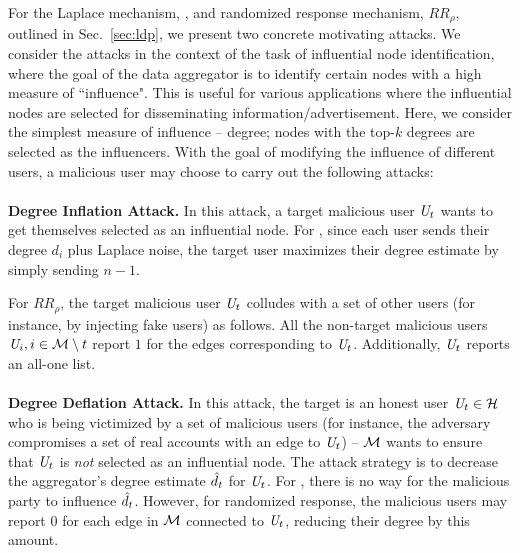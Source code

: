 For the Laplace mechanism, \RLap, and randomized response mechanism, $RR_\rho$,  outlined in Sec.~\ref{sec:ldp}, we present two concrete motivating attacks. We consider the attacks in the context of the task of influential node identification, where the goal of the data aggregator is to identify certain nodes with a high measure of ``influence". This is useful for various applications where the influential nodes are selected for disseminating information/advertisement. Here, we consider the simplest measure of influence -- degree; nodes with the top-$k$ degrees are selected as the influencers. With the goal of modifying the influence of different users, a malicious user may choose to carry out the following attacks:
  \vspace{-0.2cm}  \\\\\noindent\textbf{Degree Inflation Attack.} In this attack, a target malicious user $\textit{U}_t$ wants to get themselves selected as an influential node. For \RLap, since each user sends their degree $d_i$ plus Laplace noise, the target user maximizes their degree estimate by simply sending $n-1$. 

For $RR_\rho$, the target malicious user $\textit{U}_t$ colludes with a set of other users  (for instance, by injecting fake users) as follows. All the non-target malicious users $\textit{U}_i, i \in \mathcal{M}\setminus t$ report $1$ for the edges corresponding to $\textit{U}_t$. Additionally, $\textit{U}_t$ reports an all-one list.   \vspace{-0.2cm}  \\\\
\noindent\textbf{Degree Deflation Attack.}   In this attack, the target is an honest user $\textit{U}_t \in \mathcal{H}$ who is being victimized by a set of malicious users (for instance, the adversary compromises a set of real accounts with an edge to $\textit{U}_t$) -- $\mathcal{M}$ wants to ensure that $\textit{U}_t$ is \textit{not} selected as an influential node. The attack strategy is to decrease the aggregator's degree estimate $\hat{d}_t$ for $\textit{U}_t$. For \RLap, there is no way for the malicious party to influence $\hat{d}_t$. However, for randomized response, the malicious users may report $0$ for each edge in $\mathcal{M}$ connected to $\textit{U}_t$, reducing their degree by this amount. %
